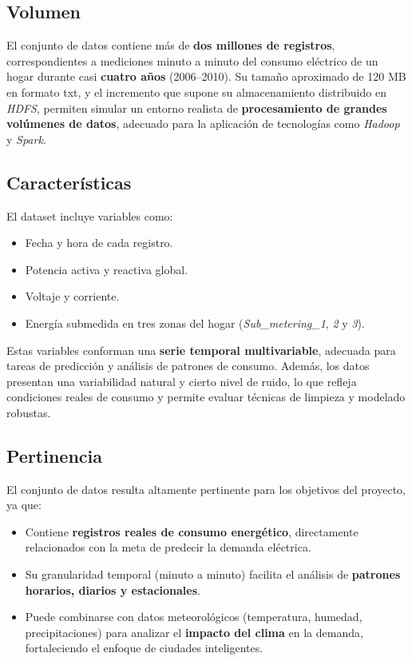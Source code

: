 \documentclass[12pt,a4paper]{article}
\begin{document}
\subsection*{Volumen}
El conjunto de datos contiene más de \textbf{dos millones de registros}, correspondientes a mediciones minuto a minuto del consumo eléctrico de un hogar durante casi \textbf{cuatro años} (2006–2010).  
Su tamaño aproximado de 120 MB en formato txt, y el incremento que supone su almacenamiento distribuido en \textit{HDFS}, permiten simular un entorno realista de \textbf{procesamiento de grandes volúmenes de datos}, adecuado para la aplicación de tecnologías como \textit{Hadoop} y \textit{Spark}.

\subsection*{Características}
El dataset incluye variables como:
\begin{itemize}
    \item Fecha y hora de cada registro.
    \item Potencia activa y reactiva global.
    \item Voltaje y corriente.
    \item Energía submedida en tres zonas del hogar (\textit{Sub\_metering\_1}, \textit{2} y \textit{3}).
\end{itemize}
Estas variables conforman una \textbf{serie temporal multivariable}, adecuada para tareas de predicción y análisis de patrones de consumo.  
Además, los datos presentan una variabilidad natural y cierto nivel de ruido, lo que refleja condiciones reales de consumo y permite evaluar técnicas de limpieza y modelado robustas.

\subsection*{Pertinencia}
El conjunto de datos resulta altamente pertinente para los objetivos del proyecto, ya que:
\begin{itemize}
    \item Contiene \textbf{registros reales de consumo energético}, directamente relacionados con la meta de predecir la demanda eléctrica.
    \item Su granularidad temporal (minuto a minuto) facilita el análisis de \textbf{patrones horarios, diarios y estacionales}.
    \item Puede combinarse con datos meteorológicos (temperatura, humedad, precipitaciones) para analizar el \textbf{impacto del clima} en la demanda, fortaleciendo el enfoque de ciudades inteligentes.
\end{itemize}
\end{document}
